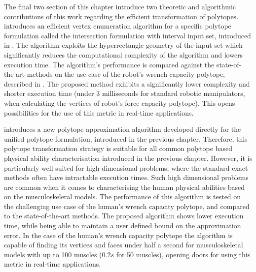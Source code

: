 The final two section of this chapter introduce two theoretic and algorithmic contributions of this work regarding the efficient transformation of polytopes.  introduces an efficient vertex enumeration algorithm for a specific polytope formulation called the intersection formulation with interval input set, introduced in . The algorithm exploits the hyperrectangle geometry of the input set which significantly reduces the computational complexity of the algorithm and lowers execution time. The algorithm's performance is compared against the state-of-the-art methods on the use case of the robot's wrench capacity polytope, described in . 
The proposed method exhibits a significantly lower complexity and shorter execution time (under 3 milliseconds for standard robotic manipulators, when calculating the vertices of robot’s force capacity polytope). This opens possibilities for the use of this metric in real-time applications. 

 introduces a new polytope approximation algorithm developed directly for the unified polytope formulation, introduced in the previous chapter. Therefore, this polytope transformation strategy is suitable for all common polytope based physical ability characterisation introduced in the previous chapter. However, it is particularly well suited for high-dimensional problems, where the standard exact methods often have intractable execution times. Such high dimensional problems are common when it comes to characterising the human physical abilities based on the musculoskeleral models. The performance of this algorithm is tested on the challenging use case of the human's wrench capacity polytope, and compared to the state-of-the-art methods. The proposed algorithm shows lower execution time, while being able to maintain a user defined bound on the approximation error. In the case of the human's wrench capacity polytope the algorithm is capable of finding its vertices and faces under half a second for musculoskeletal models with up to 100 muscles (0.2$s$ for 50 muscles), opening doors for using this metric in real-time applications.



